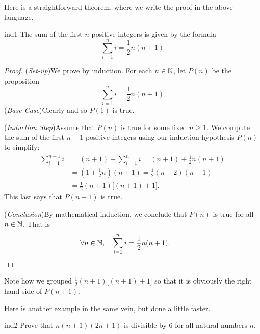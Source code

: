 Here is a straightforward theorem, where we write the proof in the above language.

\begin{thm}{}{ind1}
	The sum of the first $n$ positive integers is given by the formula
	\[
		\sum_{i=1}^ni=\frac 12n(n+1)
	\]
\end{thm}

\begin{proof}
	(\emph{Set-up})\quad We prove by induction. For each $n\in\mathbb{N}$, let $P(n)$ be the proposition
	\[
		\sum_{i=1}^ni=\frac 12n(n+1)
	\]
	(\emph{Base Case})\quad Clearly  and so $P(1)$ is true.\par
	(\emph{Induction Step})\quad Assume that $P(n)$ is true for some fixed $n\ge 1$. We compute the sum of the first $n+1$ positive integers using our induction hypothesis $P(n)$ to simplify:
	  \begin{align*}
		\sum_{i=1}^{n+1}i&=(n+1)+\sum_{i=1}^ni=(n+1)+\frac 12n(n+1)\tag*{(by assumption of $P(n)$)}\\
		&=\left(1+\frac 12n\right)(n+1)=\frac 12(n+2)(n+1)\\
		&=\frac 12(n+1)\bigl[(n+1)+1\bigr].
	  \end{align*}
	This last says that $P(n+1)$ is true.\par
	(\emph{Conclusion})\quad By mathematical induction, we conclude that $P(n)$ is true for all $n\in\mathbb{N}$. That is
	\begin{gather*}
		\forall n\in\mathbb{N},\quad \sum\limits_{i=1}^ni=\frac 12n(n+1).\tag*{\qedhere}
	\end{gather*}
\end{proof}

Note how we grouped $\frac 12(n+1)\bigl[(n+1)+1\bigr]$ so that it is obviously the right hand side of $P(n+1)$.\par

Here is another example in the same vein, but done a little faster.

\begin{thm}{}{ind2}
	Prove that $n(n+1)(2n+1)$ is divisible by 6 for all natural numbers $n$.
\end{thm}


